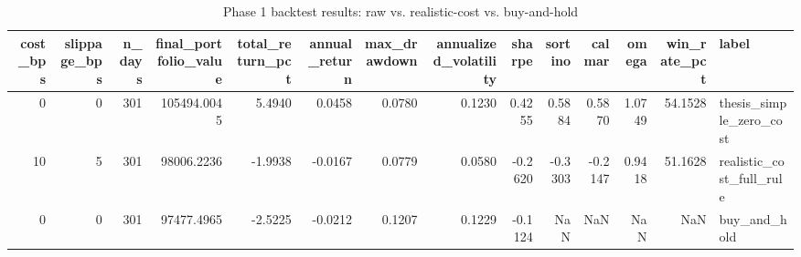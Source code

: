 \begin{table}
\caption{Phase 1 backtest results: raw vs. realistic-cost vs. buy-and-hold}
\begin{tabular}{rrrrrrrrrrrrrl}
\toprule
cost_bps & slippage_bps & n_days & final_portfolio_value & total_return_pct & annual_return & max_drawdown & annualized_volatility & sharpe & sortino & calmar & omega & win_rate_pct & label \\
\midrule
0 & 0 & 301 & 105494.0045 & 5.4940 & 0.0458 & 0.0780 & 0.1230 & 0.4255 & 0.5884 & 0.5870 & 1.0749 & 54.1528 & thesis_simple_zero_cost \\
10 & 5 & 301 & 98006.2236 & -1.9938 & -0.0167 & 0.0779 & 0.0580 & -0.2620 & -0.3303 & -0.2147 & 0.9418 & 51.1628 & realistic_cost_full_rule \\
0 & 0 & 301 & 97477.4965 & -2.5225 & -0.0212 & 0.1207 & 0.1229 & -0.1124 & NaN & NaN & NaN & NaN & buy_and_hold \\
\bottomrule
\end{tabular}
\end{table}
